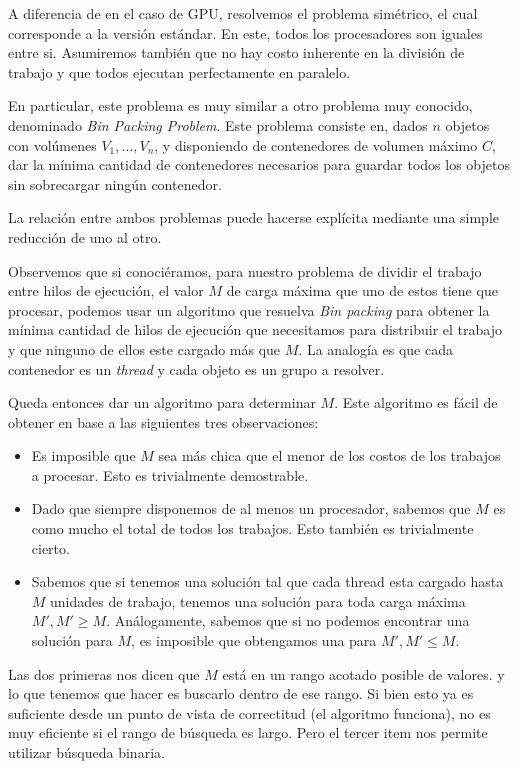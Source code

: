 A diferencia de en el caso de GPU, resolvemos el problema sim\'etrico, el cual
corresponde a la versi\'on est\'andar. En este, todos los procesadores son
iguales entre si. Asumiremos tambi\'en que no hay costo inherente en la
divisi\'on de trabajo y que todos ejecutan perfectamente en paralelo.

En particular, este problema es muy similar a otro problema muy conocido,
denominado \textit{Bin Packing Problem}. Este problema consiste en, dados $n$
objetos con vol\'umenes $V_1, \dots, V_n$, y disponiendo de contenedores de
volumen m\'aximo $C$, dar la m\'inima cantidad de contenedores necesarios para
guardar todos los objetos sin sobrecargar ning\'un contenedor.

La relaci\'on entre ambos problemas puede hacerse expl\'icita mediante una simple
reducci\'on de uno al otro.

Observemos que si conoci\'eramos, para nuestro problema de dividir el trabajo entre
hilos de ejecuci\'on, el valor $M$ de carga m\'axima que uno de estos tiene que
procesar, podemos usar un algoritmo que resuelva \textit{Bin packing} para
obtener la m\'inima cantidad de hilos de ejecuci\'on que necesitamos para distribuir
el trabajo y que ninguno de ellos este cargado m\'as que $M$. La analog\'ia es
que cada contenedor es un \textit{thread} y cada objeto es un grupo a resolver.

Queda entonces dar un algoritmo para determinar $M$. Este algoritmo es f\'acil
de obtener en base a las siguientes tres observaciones:

\begin{itemize}
    \item Es imposible que $M$ sea m\'as chica que el menor de los costos de los
    trabajos a procesar. Esto es trivialmente demostrable.
    \item Dado que siempre disponemos de al menos un procesador, sabemos que $M$
    es como mucho el total de todos los trabajos. Esto tambi\'en es trivialmente
    cierto.
    \item Sabemos que si tenemos una soluci\'on tal que cada thread esta cargado
    hasta $M$ unidades de trabajo, tenemos una soluci\'on para toda carga m\'axima
    $M', M' \geq M$. An\'alogamente, sabemos que si no podemos encontrar una
    soluci\'on para $M$, es imposible que obtengamos una para $M', M' \leq M$.
\end{itemize}

Las dos primeras nos dicen que $M$ est\'a en un rango acotado posible de valores.
y lo que tenemos que hacer es buscarlo dentro de ese rango. Si bien esto ya es
suficiente desde un punto de vista de correctitud (el algoritmo funciona), no es
muy eficiente si el rango de b\'usqueda es largo. Pero el tercer item nos permite
utilizar b\'usqueda binaria.

